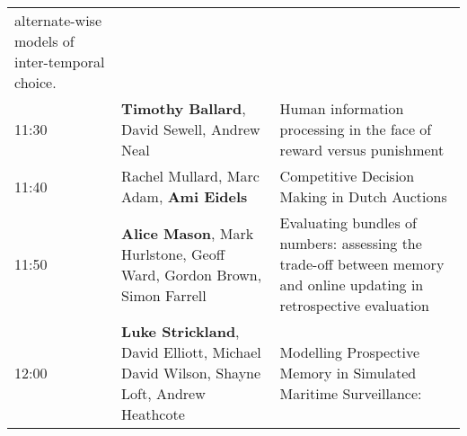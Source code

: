 \documentclass[]{article}
\begin{document}
\begin{longtable}[]{@{}lll@{}}
\begin{minipage}[t]{0.51\columnwidth}
alternate-wise models of inter-temporal choice.\strut
\end{minipage}\tabularnewline
\begin{minipage}[t]{0.03\columnwidth}\raggedright\strut
11:30\strut
\end{minipage} & \begin{minipage}[t]{0.38\columnwidth}\raggedright\strut
\textbf{Timothy Ballard}, David Sewell, Andrew Neal\strut
\end{minipage} & \begin{minipage}[t]{0.51\columnwidth}\raggedright\strut
Human information processing in the face of reward versus
punishment\strut
\end{minipage}\tabularnewline
\begin{minipage}[t]{0.03\columnwidth}\raggedright\strut
11:40\strut
\end{minipage} & \begin{minipage}[t]{0.38\columnwidth}\raggedright\strut
Rachel Mullard, Marc Adam, \textbf{Ami Eidels}\strut
\end{minipage} & \begin{minipage}[t]{0.51\columnwidth}\raggedright\strut
Competitive Decision Making in Dutch Auctions\strut
\end{minipage}\tabularnewline
\begin{minipage}[t]{0.03\columnwidth}\raggedright\strut
11:50\strut
\end{minipage} & \begin{minipage}[t]{0.38\columnwidth}\raggedright\strut
\textbf{Alice Mason}, Mark Hurlstone, Geoff Ward, Gordon Brown, Simon
Farrell\strut
\end{minipage} & \begin{minipage}[t]{0.51\columnwidth}\raggedright\strut
Evaluating bundles of numbers: assessing the trade-off between memory
and online updating in retrospective evaluation\strut
\end{minipage}\tabularnewline
\begin{minipage}[t]{0.03\columnwidth}\raggedright\strut
12:00\strut
\end{minipage} & \begin{minipage}[t]{0.38\columnwidth}\raggedright\strut
\textbf{Luke Strickland}, David Elliott, Michael David Wilson, Shayne
Loft, Andrew Heathcote\strut
\end{minipage} & \begin{minipage}[t]{0.51\columnwidth}\raggedright\strut
Modelling Prospective Memory in Simulated Maritime Surveillance:

\end{minipage}
\end{longtable}
\end{document}
